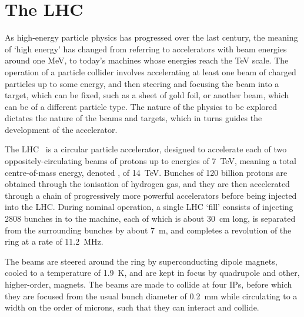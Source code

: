 \chapter{The \acl{LHC}}
\label{chap:intro:lhc}

As high-energy particle physics has progressed over the last century, the 
meaning of `high energy' has changed from referring to accelerators with beam 
energies around one \si{\MeV}, to today's machines whose energies reach the 
\si{\TeV} scale.
The operation of a particle collider involves accelerating at least one beam of 
charged particles up to some energy, and then steering and focusing the beam 
into a target, which can be fixed, such as a sheet of gold foil, or another 
beam, which can be of a different particle type.
The nature of the physics to be explored dictates the nature of the beams and 
targets, which in turns guides the development of the accelerator.

The \acl{LHC}~\cite{Bruning:2004ej} is a circular particle accelerator, 
designed to accelerate each of two oppositely-circulating beams of protons up 
to energies of \SI{7}{\TeV}, meaning a total centre-of-mass energy, denoted 
\sqrts, of \SI{14}{\TeV}.
Bunches of 120 billion protons are obtained through the ionisation of hydrogen 
gas, and they are then accelerated through a chain of progressively more 
powerful accelerators before being injected into the \ac{LHC}.
During nominal operation, a single \ac{LHC} `fill' consists of injecting 2808 
bunches in to the machine, each of which is about \SI{30}{\centi\metre} long, 
is separated from the surrounding bunches by about \SI{7}{\metre}, and 
completes a revolution of the ring at a rate of \SI{11.2}{\mega\hertz}.

The beams are steered around the ring by superconducting dipole magnets, cooled 
to a temperature of \SI{1.9}{\kelvin}, and are kept in focus by quadrupole and 
other, higher-order, magnets.
The beams are made to collide at four \acp{IP}, before which they are focused 
from the usual bunch diameter of \SI{0.2}{\milli\metre} while circulating to a 
width on the order of microns, such that they can interact and collide.


